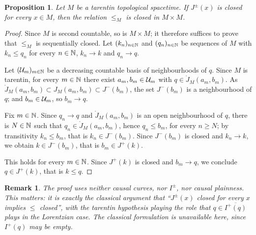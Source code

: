\documentclass[a4paper,twoside]{article}
\newtheorem{prop}[lem]{Proposition}
\newtheorem{rem}[lem]{Remark}
\begin{document}
\begin{prop}\label{prop:relation_fermee}
Let $M$ be a tarentin topological spacetime. If $J^\pm(x)$ is closed for every $x\in M$, then the
relation $\leq_M$ is closed in $M\times M$.
\end{prop}
\begin{proof}
Since $M$ is second countable, so is $M\times M$; it therefore suffices to prove that $\leq_M$ is
sequentially closed. Let $(k_n)_{n\in \mathbb{N}}$ and $(q_n)_{n\in \mathbb{N}}$ be sequences of $M$ with
$k_n\leq q_n$ for every $n\in \mathbb{N}$, $k_n\rightarrow k$ and $q_n\rightarrow q$.

Let $(\mathcal{U}_m)_{m\in \mathbb{N}}$ be a decreasing countable basis of neighbourhoods of $q$. Since $M$ is
tarentin, for every $m\in \mathbb{N}$ there exist $a_m,b_m\in \mathcal{U}_m$ with $q\in \ring J_M(a_m,b_m)$. As
$\ring J_M(a_m,b_m)\subset J_M(a_m,b_m)\subset J^-(b_m)$, the set $J^-(b_m)$ is a neighbourhood of
$q$; and $b_m\in \mathcal{U}_m$, so $b_m\rightarrow q$.

Fix $m\in \mathbb{N}$. Since $q_n\rightarrow q$ and $\ring J_M(a_m,b_m)$ is an open neighbourhood of $q$,
there is $N\in \mathbb{N}$ such that $q_n\in \ring J_M(a_m,b_m)$, hence $q_n\leq b_m$, for every $n\geq N$;
by transitivity $k_n\leq b_m$, that is $k_n\in J^-(b_m)$. Since $J^-(b_m)$ is closed and
$k_n\rightarrow k$, we obtain $k\in J^-(b_m)$, that is $b_m\in J^+(k)$.

This holds for every $m\in \mathbb{N}$. Since $J^+(k)$ is closed and $b_m\rightarrow q$, we conclude
$q\in J^+(k)$, that is $k\leq q$.
\end{proof}
\begin{rem}
The proof uses neither causal curves, nor $I^\pm$, nor causal plainness. This matters: it is exactly
the classical argument that ``$J^\pm(x)$ closed for every $x$ implies $\leq$ closed'', with the
tarentin hypothesis playing the role that $q\in \overline{I^+(q)}$ plays in the Lorentzian case.
The classical formulation is unavailable here, since $I^+(q)$ may be empty.
\end{rem}
\end{document}
